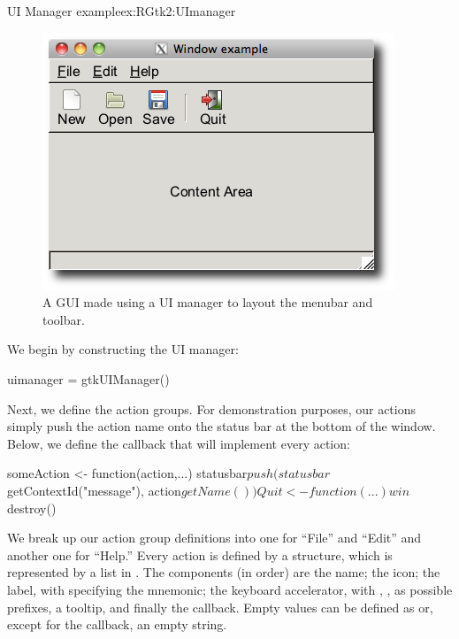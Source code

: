 \begin{example}{UI Manager example}{ex:RGtk2:UImanager}

\begin{figure}
  \centering
  \includegraphics[width=.6\textwidth]{ex-RGtk2-UI}
  \caption{A GUI made using a UI manager to layout the menubar and toolbar.}
  \label{fig:RGtk2-UI}
\end{figure}


We begin by constructing the UI manager:
\begin{Schunk}
\begin{Sinput}
 uimanager = gtkUIManager()
\end{Sinput}
\end{Schunk}

Next, we define the action groups. For demonstration purposes, our
actions simply push the action name onto the status bar at the bottom
of the window. Below, we define the callback that will implement every
action:
\begin{Schunk}
\begin{Sinput}
 someAction <- function(action,...) 
   statusbar$push(statusbar$getContextId("message"), 
                  action$getName())
 Quit <- function(...) win$destroy()
\end{Sinput}
\end{Schunk}

We break up our action group definitions into one for ``File'' and
``Edit'' and another one for ``Help.'' Every action is defined by a
 structure, which is represented by a list in
\R. The components (in order) are the name; the icon; the
label, with \code{\_} specifying the mnemonic; the keyboard
accelerator, with , ,  as
possible prefixes, a tooltip, and finally the callback. Empty values
can be defined as  or, except for the callback, an empty
string.


\end{example}

